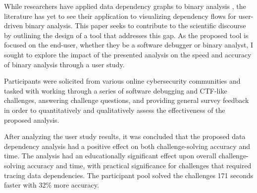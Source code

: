 While researchers have applied data dependency graphs to binary analysis \citep{serpilliere_2017, zhang2019bda}, the literature has yet to see their application to visualizing dependency flows for user-driven binary analysis. This paper seeks to contribute to the scientific discourse by outlining the design of a tool that addresses this gap. As the proposed tool is focused on the end-user, whether they be a software debugger or binary analyst, I sought to explore the impact of the presented analysis on the speed and accuracy of binary analysis through a user study.

Participants were solicited from various online cybersecurity communities and tasked with working through a series of software debugging and CTF-like challenges, answering challenge questions, and providing general survey feedback in order to quantitatively and qualitatively assess the effectiveness of the proposed analysis.

After analyzing the user study results, it was concluded that the proposed data dependency analysis had a positive effect on both challenge-solving accuracy and time. The analysis had an educationally significant effect upon overall challenge-solving accuracy and time, with practical significance for challenges that required tracing data dependencies. The participant pool solved the challenges 171 seconds faster with 32\% more accuracy.